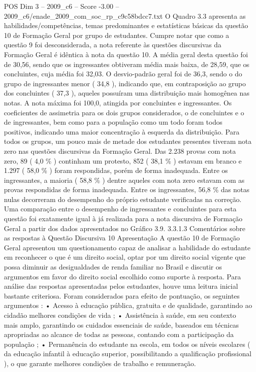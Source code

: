 \begin{textsample}{POS Dim 3 – 2009\_c6 – Score -3.00 – 2009\_c6/enade\_2009\_com\_soc\_rp\_c9c58bdcc7.txt}
O Quadro 3.3 apresenta as habilidades/competências, temas predominantes e estatísticas básicas da questão 10 de Formação Geral por grupo de estudantes.
Cumpre notar que como a questão 9 foi desconsiderada, a nota referente às questões discursivas da Formação Geral é idêntica à nota da questão 10.
A média geral desta questão foi de 30,56, sendo que os ingressantes obtiveram média mais baixa, de 28,59, que os concluintes, cuja média foi 32,03.
O desvio-padrão geral foi de 36,3, sendo o do grupo de ingressantes menor ( 34,8 ), indicando que, em contraposição ao grupo dos concluintes ( 37,3 ), aqueles possuíram uma distribuição mais homogênea nas notas.
A nota máxima foi 100,0, atingida por concluintes e ingressantes.
Os coeficientes de assimetria para os dois grupos considerados, o de concluintes e o de ingressantes, bem como para a população como um todo foram todos positivos, indicando uma maior concentração à esquerda da distribuição.
Para todos os grupos, um pouco mais de metade dos estudantes presentes tiveram nota zero nas questões discursivas da Formação Geral.
Das 2.238 provas com nota zero, 89 ( 4,0 \% ) continham um protesto, 852 ( 38,1 \% ) estavam em branco e 1.297 ( 58,0 \% ) foram respondidas, porém de forma inadequada.
Entre os ingressantes, a maioria ( 58,8 \% ) dentre aqueles com nota zero estavam com as provas respondidas de forma inadequada.
Entre os ingressantes, 56,8 \% das notas nulas decorreram do desempenho do próprio estudante verificadas na correção.
Uma comparação entre o desempenho de ingressantes e concluintes para esta questão foi exatamente igual à já realizada para a nota discursiva de Formação Geral a partir dos dados apresentados no Gráfico 3.9. 3.3.1.3 Comentários sobre as respostas à Questão Discursiva 10 Apresentação A questão 10 de Formação Geral apresentou um questionamento capaz de analisar a habilidade do estudante em reconhecer o que é um direito social, optar por um direito social vigente que possa diminuir as desigualdades de renda familiar no Brasil e discutir os argumentos em favor do direito social escolhido como suporte à resposta.
Para análise das respostas apresentadas pelos estudantes, houve uma leitura inicial bastante criteriosa.
Foram considerados para efeito de pontuação, os seguintes argumentos : • Acesso à educação pública, gratuita e de qualidade, garantindo ao cidadão melhores condições de vida ; • Assistência à saúde, em seu contexto mais amplo, garantindo os cuidados essenciais de saúde, baseados em técnicas apropriadas ao alcance de todas as pessoas, contando com a participação da população ; • Permanência do estudante na escola, em todos os níveis escolares ( da educação infantil à educação superior, possibilitando a qualificação profissional ), o que garante melhores condições de trabalho e remuneração.

\end{textsample}
